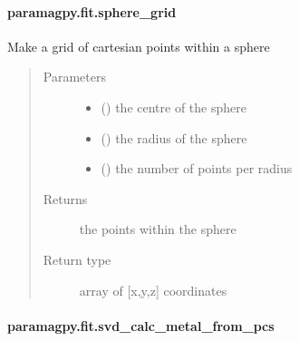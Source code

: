 \documentclass[a4paper,10pt,english,openany,oneside]{sphinxmanual}
\begin{document}
\paragraph{paramagpy.fit.sphere\_grid}
\label{\detokenize{reference/generated/paramagpy.fit.sphere_grid:paramagpy-fit-sphere-grid}}\label{\detokenize{reference/generated/paramagpy.fit.sphere_grid::doc}}

\begin{fulllineitems}
\label{\detokenize{reference/generated/paramagpy.fit.sphere_grid:paramagpy.fit.sphere_grid}}
Make a grid of cartesian points within a sphere
\begin{quote}\begin{description}
\item[{Parameters}] \leavevmode\begin{itemize}
\item {} 
 () \textendash{} the centre of the sphere

\item {} 
 () \textendash{} the radius of the sphere

\item {} 
 () \textendash{} the number of points per radius

\end{itemize}

\item[{Returns}] \leavevmode
{} \textendash{} the points within the sphere

\item[{Return type}] \leavevmode
array of {[}x,y,z{]} coordinates

\end{description}\end{quote}

\end{fulllineitems}



\paragraph{paramagpy.fit.svd\_calc\_metal\_from\_pcs}
\label{\detokenize{reference/generated/paramagpy.fit.svd_calc_metal_from_pcs:paramagpy-fit-svd-calc-metal-from-pcs}}\label{\detokenize{reference/generated/paramagpy.fit.svd_calc_metal_from_pcs::doc}}
\end{document}
